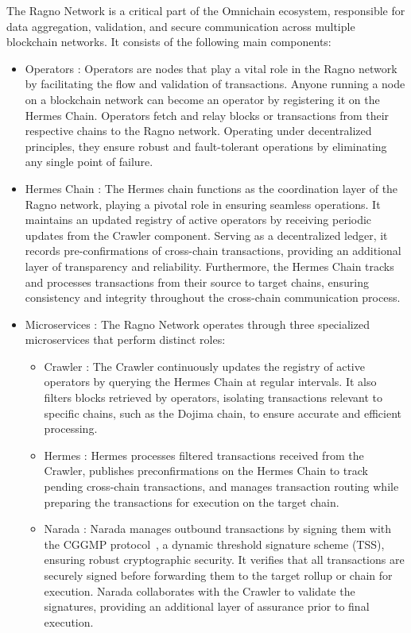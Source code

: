 The Ragno Network is a critical part of the Omnichain ecosystem, responsible for data aggregation, validation, and secure communication across multiple blockchain networks. It consists of the following main components:

\begin{itemize}
    \item \textsf{Operators :} Operators are nodes that play a vital role in the Ragno network by facilitating the flow and validation of transactions. Anyone running a node on a blockchain network can become an operator by registering it on the Hermes Chain. Operators fetch and relay blocks or transactions from their respective chains to the Ragno network. Operating under decentralized principles, they ensure robust and fault-tolerant operations by eliminating any single point of failure.
    \item \textsf{Hermes Chain :} The Hermes chain functions as the coordination layer of the Ragno network, playing a pivotal role in ensuring seamless operations. It maintains an updated registry of active operators by receiving periodic updates from the Crawler component. Serving as a decentralized ledger, it records pre-confirmations of cross-chain transactions, providing an additional layer of transparency and reliability. Furthermore, the Hermes Chain tracks and processes transactions from their source to target chains, ensuring consistency and integrity throughout the cross-chain communication process.
    \item \textsf{Microservices :} The Ragno Network operates through three specialized microservices that perform distinct roles:
    \begin{itemize}
        \item \textsf{Crawler :} The Crawler continuously updates the registry of active operators by querying the Hermes Chain at regular intervals. It also filters blocks retrieved by operators, isolating transactions relevant to specific chains, such as the Dojima chain, to ensure accurate and efficient processing.
        \item \textsf{Hermes :} Hermes processes filtered transactions received from the Crawler, publishes preconfirmations on the Hermes Chain to track pending cross-chain transactions, and manages transaction routing while preparing the transactions for execution on the target chain.
        \item \textsf{Narada :} Narada manages outbound transactions by signing them with the CGGMP protocol~\cite{tss}, a dynamic threshold signature scheme (TSS), ensuring robust cryptographic security. It verifies that all transactions are securely signed before forwarding them to the target rollup or chain for execution. Narada collaborates with the Crawler to validate the signatures, providing an additional layer of assurance prior to final execution.
    \end{itemize}
\end{itemize} 

